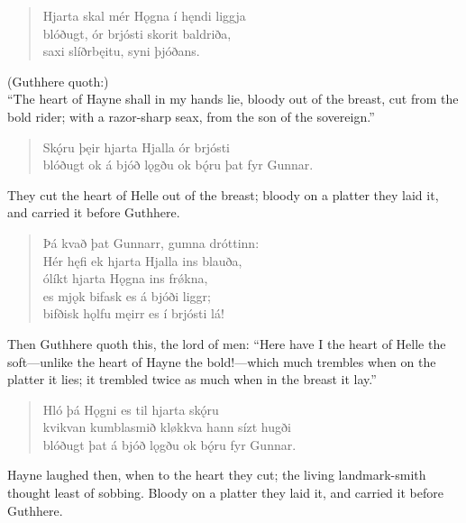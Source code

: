 \bookStart

\begin{verse}
\bva Hjarta skal mér Hǫgna \hld í hęndi liggja  \\%
blóðugt, ór brjósti \hld skorit baldriða, \\%
saxi slíðrbęitu, \hld syni þjóðans.\\%
\end{verse}

\bvb (Guthhere quoth:) \\ “The heart of Hayne shall in my hands lie, bloody out of the breast, cut from the bold rider; with a razor-sharp seax, from the son of the sovereign.”

\begin{verse}
\bva Skǫ́ru þęir hjarta \hld Hjalla ór brjósti \\%
blóðugt ok á bjóð lǫgðu \hld ok bǫ́ru þat fyr Gunnar.\\%
\end{verse}

\bvb They cut the heart of Helle out of the breast; bloody on a platter they laid it, and carried it before Guthhere.

\begin{verse}
\bva Þá kvað þat Gunnarr, \hld gumna dróttinn: \\%
Hér hęfi ek hjarta \hld Hjalla ins blauða, \\%
ólíkt hjarta \hld Hǫgna ins frǿkna, \\%
es mjǫk bifask \hld es á bjóði liggr; \\%
bifðisk hǫlfu męirr \hld es í brjósti lá!\\%
\end{verse}

\bvb Then Guthhere quoth this, the lord of men: “Here have I the heart of Helle the soft—unlike the heart of Hayne the bold!—which much trembles when on the platter it lies; it trembled twice as much when in the breast it lay.”

\begin{verse}
\bva Hló þá Hǫgni \hld es til hjarta skǫ́ru \\%
kvikvan kumblasmið \hld kløkkva hann sízt hugði \\%
blóðugt þat á bjóð lǫgðu \hld ok bǫ́ru fyr Gunnar.\\%
\end{verse}

\bvb Hayne laughed then, when to the heart they cut; the living landmark-smith thought least of sobbing. Bloody on a platter they laid it, and carried it before Guthhere.

